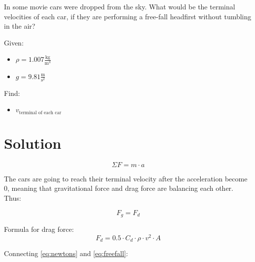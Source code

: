 
In some movie cars were dropped from the sky.
What would be the terminal velocities of each car, if they are
performing a free-fall headfirst without tumbling in the air?

\bigbreak Given:
\begin{itemize}
    \item $ \rho = 1.007 \frac{\text{kg}}{\text{m}^3} $
    \item $ g = 9.81 \frac{\text{m}}{\text{s}^2} $
\end{itemize}

Find:
\begin{itemize}
    \item $ v_{\text{terminal of each car}} $
\end{itemize}


\section*{Solution}

\begin{equation}
    \label{eq:newtons}
    \Sigma F = m \cdot a
\end{equation}

The cars are going to reach their terminal velocity after the acceleration become 0,
meaning that gravitational force and drag force are balancing each other. Thus:

$$ F_g = F_d $$

Formula for drag force:
\begin{equation}
    \label{eq:freefall}
    F_d = 0.5 \cdot C_d \cdot \rho \cdot v^2 \cdot A
\end{equation}


Connecting \ref{eq:newtons} and \ref{eq:freefall}:
